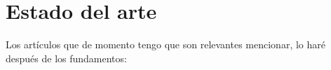 \chapter{Estado del arte}
Los artículos que de momento tengo que son relevantes mencionar, lo haré después de los fundamentos:
\cite{NIST_IR_8413_2022} \cite{NIST_IR_8545_2025} \cite{011318_1_5.0179566} \cite{s11042-024-20535-x} \cite{A_COMPARATIVE_REVIEW_OF_DATA_ENCRYPTION_METHODS_IN_THE_USA_AND_EUROPE} \cite{An_Overview_and_Analysis_of_Hybrid_Encryption_The_Combination_of_Symmetric_Encryption_and_Asymmetric_Encryption} \cite{Comparative_Analysis_of_Energy_Costs_of_Asymmetric_vs_Symmetric_Encryption-Based_Security_Applications} \cite{First-Order-Masked-Kyber-on-ARM Cortex-M4} \cite{2022-414} \cite{An_overview_of_Quantum_Cryptography_and} \cite{2502.12252v1} \cite{Quantum_Resistance_Saber-Based_Group_Key_Exchange_Protocol_for_IoT} \cite{NISTFIPS203}